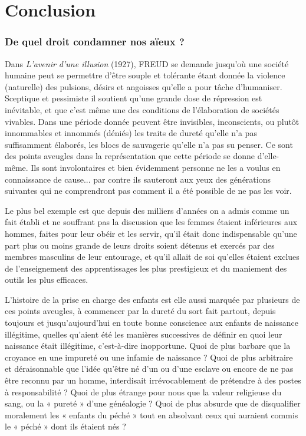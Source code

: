 
\part{Conclusion}




  \section{De quel droit condamner nos aïeux ?} 
 
 Dans \emph{L'avenir d'une illusion} (1927), FREUD se demande jusqu'où une société humaine peut se permettre d'être souple et tolérante étant donnée la violence (naturelle) des pulsions, désirs et angoisses qu'elle a pour tâche d'humaniser. Sceptique et pessimiste il soutient qu'une grande dose de répression est inévitable, et que c'est même une des conditions de l'élaboration de sociétés vivables. Dans une période donnée peuvent être invisibles, inconscients, ou plutôt innommables et innommés (déniés) les traits de dureté qu'elle n'a pas suffisamment élaborés, les blocs de sauvagerie qu'elle n'a pas su penser. Ce sont des points aveugles dans la représentation que cette période se donne d'elle-même. Ils sont involontaires et bien évidemment personne ne les a voulus en connaissance de cause... par contre ils sauteront aux yeux des générations suivantes qui ne comprendront pas comment il a été possible de ne pas les voir. 
 
 Le plus bel exemple est que depuis des milliers d'années on a admis comme un fait établi et ne souffrant pas la discussion que les femmes étaient inférieures aux hommes, faites pour leur obéir et les servir, qu'il était donc indispensable qu'une part plus ou moins grande de leurs droits soient détenus et exercés par des membres masculins de leur entourage, et qu’il allait de soi qu’elles étaient  exclues de l’enseignement des apprentissages les plus prestigieux et du maniement des outils les plus efficaces.
 
L'histoire de la prise en charge des enfants est elle aussi marquée par plusieurs de ces points aveugles, à commencer par la dureté du sort fait partout, depuis toujours et jusqu'aujourd'hui en toute bonne conscience aux enfants de naissance illégitime, quelles qu'aient été les manières successives de définir en quoi leur naissance était illégitime, c'est-à-dire inopportune. Quoi de plus barbare que la croyance en une impureté ou une infamie de naissance ? Quoi de plus arbitraire et déraisonnable que l'idée qu'être né d'un ou d'une esclave ou encore de ne pas être reconnu par un homme, interdisait irrévocablement de prétendre à des postes à responsabilité ? Quoi de plus étrange pour nous que la valeur religieuse du sang, ou la « pureté » d'une généalogie ? Quoi de plus absurde que de disqualifier moralement les « enfants du péché » tout en absolvant ceux qui auraient commis le « péché » dont ils étaient nés ? 

